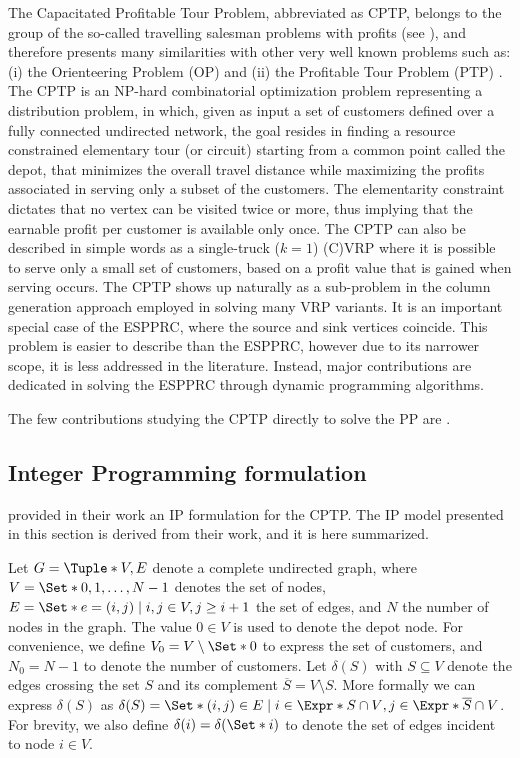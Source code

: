The Capacitated Profitable Tour Problem, abbreviated as CPTP,
belongs to the group of the so-called travelling salesman
problems with profits (see \cite{feillet2005}),
and therefore presents many similarities with other very well known
problems such as:
(i) the Orienteering Problem (OP) \parencite{golden1987, laporte1990}
and (ii) the Profitable Tour Problem (PTP) \parencite{dellamico1995}.
The CPTP is an NP-hard combinatorial optimization problem representing
a distribution problem, in which,
given as input a set of customers
defined over a fully connected undirected network, the goal resides in finding
a resource constrained elementary tour (or circuit) starting from a common point called the depot,
that minimizes the overall travel distance while maximizing
the profits associated in serving only a subset of the customers.
The elementarity constraint dictates that no vertex
can be visited twice or more, thus implying that the earnable profit
per customer is available only once.
The CPTP can also be described in simple words
as a single-truck ($k = 1$) (C)VRP where it is possible to serve only a small set of customers,
based on a profit value that is gained when serving occurs.
The CPTP shows up naturally as a sub-problem in the column generation approach employed in solving many VRP variants.
It is an important special case of the ESPPRC, where the source and sink vertices coincide.
This problem is easier to describe than the ESPPRC,
however due to its narrower scope,
it is less addressed in the literature.
Instead, major contributions are dedicated in solving the ESPPRC through dynamic programming algorithms.

The few contributions studying the CPTP directly to solve the PP
are \cite{jepsen2011, jepsen2014}.

\subsection{Integer Programming formulation}
\label{sec:cptp-integer-programming-formulation}

\textcite{letchford2013, jepsen2014} provided in their work an IP formulation for the CPTP.
The IP model presented in this section is derived from their work, and it is here summarized.

Let $G = \Tuple*{V, E}$ denote a complete undirected graph, where $V = \Set*{0, 1, \dots, N - 1}$ denotes the set of nodes,
$E = \Set*{e = (i, j) \mid i,j \in V, j \ge i + 1}$ the set of edges, and $N$ the number of nodes in the graph.
The value $0 \in V$ is used to denote the depot node.
For convenience, we define $V_0 = V \setminus \Set*{0}$ to express the set of customers, and $N_0 = N - 1$ to denote the number of customers.
Let $\delta(S)$ with $S \subseteq V$ denote the edges crossing the set $S$ and its complement $\overline{S} = V \setminus S$.
More formally we can express $\delta(S)$ as $\delta(S) = \Set*{ (i, j) \in E \mid i \in \Expr*{S \cap V}, j \in \Expr*{ \overline{S} \cap V } }$.
For brevity, we also define $\delta(i) = \delta(\Set*{i})$ to denote the set of edges incident to node $i \in V$.

